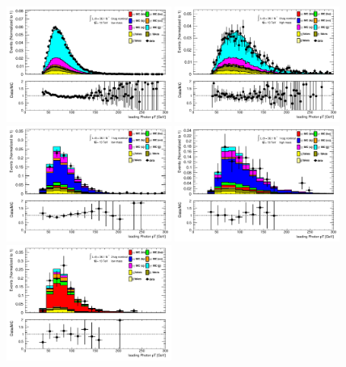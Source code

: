 \begin{figure}[htbp]
  \centering
  \includegraphics[width=0.48\textwidth]{chapters/chapter5_yybb/images/data_MC_comparison/h_CR_l_0t_nominal_leadingPhoton_pt.pdf}
  \includegraphics[width=0.48\textwidth]{chapters/chapter5_yybb/images/data_MC_comparison/h_CR_h_0t_nominal_leadingPhoton_pt.pdf}
  \includegraphics[width=0.48\textwidth]{chapters/chapter5_yybb/images/data_MC_comparison/h_SR_l_1t_nominal_leadingPhoton_pt.pdf}
  \includegraphics[width=0.48\textwidth]{chapters/chapter5_yybb/images/data_MC_comparison/h_SR_h_1t_nominal_leadingPhoton_pt.pdf}
  \includegraphics[width=0.48\textwidth]{chapters/chapter5_yybb/images/data_MC_comparison/h_SR_l_2t_nominal_leadingPhoton_pt.pdf}

\end{figure}
